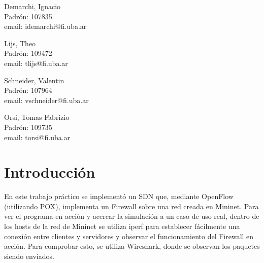 \documentclass{article}
\begin{document}
\begin{titlepage}
\begin{center}
    \begin{minipage}{.45\textwidth}
      \begin{center}
        Demarchi, Ignacio\\
        {\small Padrón: 107835}\\
        {\small email: idemarchi@fi.uba.ar}
      \end{center}
    \end{minipage}\hfill
    \begin{minipage}{.45\textwidth}
      \begin{center}
        Lijs, Theo\\
        {\small Padrón: 109472}\\
        {\small email: tlijs@fi.uba.ar}
      \end{center}
    \end{minipage}

    \vspace{1.0cm}

    \begin{minipage}{.45\textwidth}
      \begin{center}
        Schneider, Valentin\\
        {\small Padrón: 107964}\\
        {\small email: vschneider@fi.uba.ar}
      \end{center}
    \end{minipage}\hfill
    \begin{minipage}{.45\textwidth}
      \begin{center}
        Orsi, Tomas Fabrizio\\
        {\small Padrón: 109735}\\
        {\small email: torsi@fi.uba.ar}
      \end{center}
    \end{minipage}

  \end{center}
\end{titlepage}

\tableofcontents
\pagebreak

\section{Introducción}\label{introduccion}

En este trabajo práctico se implementó un SDN que, mediante OpenFlow (utilizando POX), implementa un Firewall sobre una red creada en Mininet. Para ver el programa en acción y acercar la simulación a un caso de uso real, dentro de los hosts de la red de Mininet se utiliza iperf para establecer fácilmente una conexión entre clientes y servidores y observar el funcionamiento del Firewall en acción. Para comprobar esto, se utiliza Wireshark, donde se observan los paquetes siendo enviados.
\end{document}
